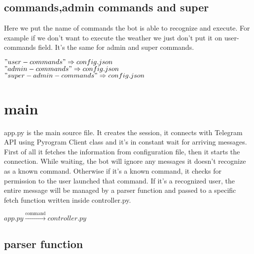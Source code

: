 \documentclass{article}
\begin{document}
\subsection{commands,admin commands and super}
Here we put the name of commands the bot is able to recognize and execute. For example if we don't want to execute the weather we just don't put it on user-commands field. It's the same for admin and super commands.
\begin{center} $"user-commands" \Rightarrow config.json$ \\
               $"admin-commands" \Rightarrow config.json$ \\
               $"super-admin-commands" \Rightarrow config.json$
\end{center}

\section{main}
app.py is the main source file. It creates the session, it connects with Telegram API using Pyrogram Client class and it's in constant wait for arriving messages.
First of all it fetches the information from configuration file, then it starts the connection.
While waiting, the bot will ignore any messages it doesn't recognize as a known command. Otherwise if it's a known command, it checks for permission to the user launched that command. If it's a recognized user, the entire message will be managed by a parser function and passed to a specific fetch function written inside controller.py.
\begin{center} $app.py \xrightarrow{\text{command}} controller.py$ \end{center}

\subsection{parser function}
\end{document}
